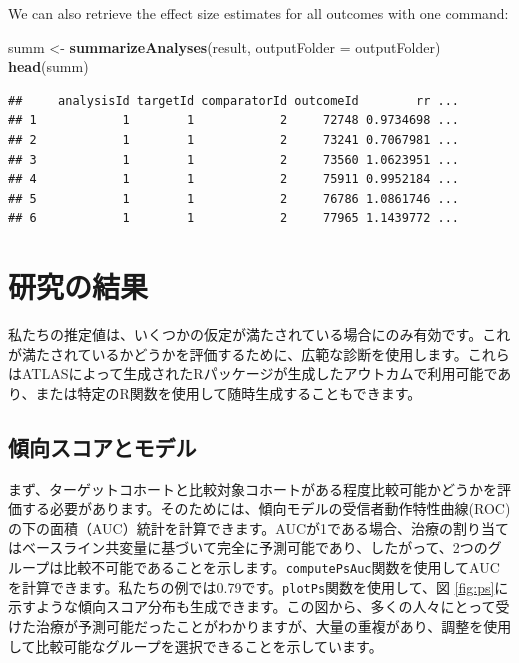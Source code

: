 \documentclass[
  11pt]{book}
\newenvironment{Shaded}{\begin{snugshade}}{\end{snugshade}}
\newcommand{\AttributeTok}[1]{\textcolor[rgb]{0.13,0.29,0.53}{#1}}
\newcommand{\FunctionTok}[1]{\textcolor[rgb]{0.13,0.29,0.53}{\textbf{#1}}}
\newcommand{\NormalTok}[1]{#1}
\newcommand{\OtherTok}[1]{\textcolor[rgb]{0.56,0.35,0.01}{#1}}
\theoremstyle{definition}
\theoremstyle{definition}
\theoremstyle{definition}
\theoremstyle{definition}
\theoremstyle{remark}
\begin{document}
We can also retrieve the effect size estimates for all outcomes with one command:

\begin{Shaded}
\begin{Highlighting}[]
\NormalTok{summ }\OtherTok{\textless{}{-}} \FunctionTok{summarizeAnalyses}\NormalTok{(result, }\AttributeTok{outputFolder =}\NormalTok{ outputFolder)}
\FunctionTok{head}\NormalTok{(summ)}
\end{Highlighting}
\end{Shaded}

\begin{verbatim}
##     analysisId targetId comparatorId outcomeId        rr ...
## 1            1        1            2     72748 0.9734698 ...
## 2            1        1            2     73241 0.7067981 ...
## 3            1        1            2     73560 1.0623951 ...
## 4            1        1            2     75911 0.9952184 ...
## 5            1        1            2     76786 1.0861746 ...
## 6            1        1            2     77965 1.1439772 ...
\end{verbatim}

\section{研究の結果}\label{studyOutputs}

私たちの推定値は、いくつかの仮定が満たされている場合にのみ有効です。これが満たされているかどうかを評価するために、広範な診断を使用します。これらはATLASによって生成されたRパッケージが生成したアウトカムで利用可能であり、または特定のR関数を使用して随時生成することもできます。

\subsection{傾向スコアとモデル}\label{ux50beux5411ux30b9ux30b3ux30a2ux3068ux30e2ux30c7ux30eb}

まず、ターゲットコホートと比較対象コホートがある程度比較可能かどうかを評価する必要があります。そのためには、傾向モデルの受信者動作特性曲線(ROC)の下の面積（AUC）統計を計算できます。AUCが1である場合、治療の割り当てはベースライン共変量に基づいて完全に予測可能であり、したがって、2つのグループは比較不可能であることを示します。\texttt{computePsAuc}関数を使用してAUCを計算できます。私たちの例では0.79です。\texttt{plotPs}関数を使用して、図 \ref{fig:ps}に示すような傾向スコア分布も生成できます。この図から、多くの人々にとって受けた治療が予測可能だったことがわかりますが、大量の重複があり、調整を使用して比較可能なグループを選択できることを示しています。 
\end{document}
